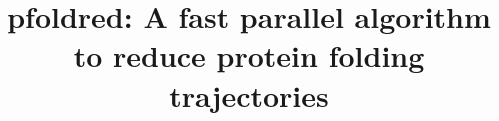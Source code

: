 \documentclass[twocolumn]{bmcart}%
\begin{document}
\begin{frontmatter}

\begin{fmbox}


\title{pfoldred: A fast parallel algorithm to reduce protein folding trajectories}


	\author[
		 addressref={aff1},                   %
		 email={lgarreta@agrosavia.co}   %
	]{ }
	\author[
		 addressref={aff2},
		 email={mmartinez@ebi.ac.uk}
	]{ }
	\author[
		 addressref={aff3},
		 email={nediaz@unicauca.edu.co}
	]{ }
	\author[
		 addressref={aff4},
		 corref={aff4},                       %
		 email={pedro.moreno@correounivalle.edu.co}
	]{ }


\end{fmbox}
\end{frontmatter}
\end{document}
